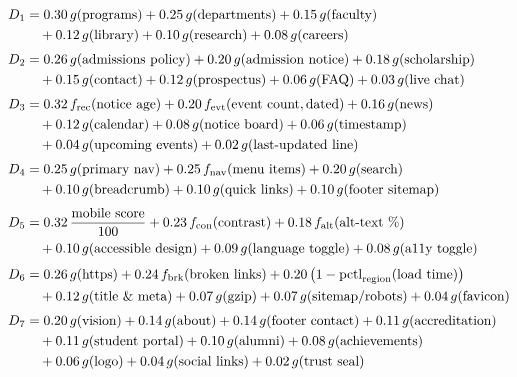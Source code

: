 \documentclass[11pt,a4paper]{article}
\begin{document}
\begin{align}
D_1 &= 0.30\,g(\text{programs}) + 0.25\,g(\text{departments}) + 0.15\,g(\text{faculty}) \notag\\
    &\quad + 0.12\,g(\text{library}) + 0.10\,g(\text{research}) + 0.08\,g(\text{careers})
    \label{eq:d1}\\[3pt]
D_2 &= 0.26\,g(\text{admissions policy}) + 0.20\,g(\text{admission notice})
       + 0.18\,g(\text{scholarship}) \notag\\
    &\quad + 0.15\,g(\text{contact}) + 0.12\,g(\text{prospectus})
       + 0.06\,g(\text{FAQ}) + 0.03\,g(\text{live chat})
    \label{eq:d2}\\[3pt]
D_3 &= 0.32\,f_{\text{rec}}(\text{notice age})
       + 0.20\,f_{\text{evt}}(\text{event count},\text{dated})
       + 0.16\,g(\text{news}) \notag\\
    &\quad + 0.12\,g(\text{calendar}) + 0.08\,g(\text{notice board})
       + 0.06\,g(\text{timestamp}) \notag\\
    &\quad + 0.04\,g(\text{upcoming events}) + 0.02\,g(\text{last-updated line})
    \label{eq:d3}\\[3pt]
D_4 &= 0.25\,g(\text{primary nav}) + 0.25\,f_{\text{nav}}(\text{menu items})
       + 0.20\,g(\text{search}) \notag\\
    &\quad + 0.10\,g(\text{breadcrumb}) + 0.10\,g(\text{quick links})
       + 0.10\,g(\text{footer sitemap})
    \label{eq:d4}\\[3pt]
D_5 &= 0.32\,\frac{\text{mobile score}}{100} + 0.23\,f_{\text{con}}(\text{contrast})
       + 0.18\,f_{\text{alt}}(\text{alt-text \%}) \notag\\
    &\quad + 0.10\,g(\text{accessible design}) + 0.09\,g(\text{language toggle})
       + 0.08\,g(\text{a11y toggle})
    \label{eq:d5}\\[3pt]
D_6 &= 0.26\,g(\text{https}) + 0.24\,f_{\text{brk}}(\text{broken links})
       + 0.20\,\bigl(1 - \mathrm{pctl}_{\text{region}}(\text{load time})\bigr) \notag\\
    &\quad + 0.12\,g(\text{title \& meta}) + 0.07\,g(\text{gzip})
       + 0.07\,g(\text{sitemap/robots}) + 0.04\,g(\text{favicon})
    \label{eq:d6}\\[3pt]
D_7 &= 0.20\,g(\text{vision}) + 0.14\,g(\text{about}) + 0.14\,g(\text{footer contact})
       + 0.11\,g(\text{accreditation}) \notag\\
    &\quad + 0.11\,g(\text{student portal}) + 0.10\,g(\text{alumni})
       + 0.08\,g(\text{achievements}) \notag\\
    &\quad + 0.06\,g(\text{logo}) + 0.04\,g(\text{social links})
       + 0.02\,g(\text{trust seal})
    \label{eq:d7}
\end{align}
\end{document}
